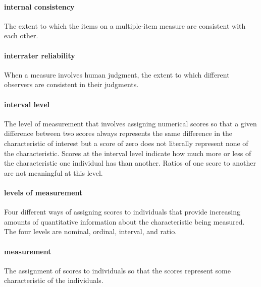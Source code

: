 \documentclass[
]{krantz}
\begin{document}
\paragraph*{internal consistency}\label{internal-consistency-1}

The extent to which the items on a multiple-item measure are consistent with each other.

\paragraph*{interrater reliability}\label{interrater-reliability-1}

When a measure involves human judgment, the extent to which different observers are consistent in their judgments.

\paragraph*{interval level}\label{interval-level}

The level of measurement that involves assigning numerical scores so that a given difference between two scores always represents the same difference in the characteristic of interest but a score of zero does not literally represent none of the characteristic. Scores at the interval level indicate how much more or less of the characteristic one individual has than another. Ratios of one score to another are not meaningful at this level.

\paragraph*{levels of measurement}\label{levels-of-measurement-1}

Four different ways of assigning scores to individuals that provide increasing amounts of quantitative information about the characteristic being measured. The four levels are nominal, ordinal, interval, and ratio.

\paragraph*{measurement}\label{measurement}

The assignment of scores to individuals so that the scores represent some characteristic of the individuals.
\end{document}
